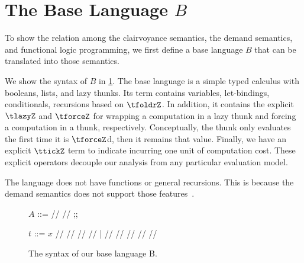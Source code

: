 \section{The Base Language $B$}



To show the relation among the clairvoyance semantics, the demand semantics, and
functional logic programming, we first define a base language $B$ that can be
translated into those semantics.

We show the syntax of $B$ in \cref{fig:syntax-base}. The base language is a
simple typed calculus with booleans, lists, and lazy thunks. Its term contains
variables, let-bindings, conditionals, recursions based on $\tfoldrZ$. In
addition, it contains the explicit \( \tlazyZ \) and \( \tforceZ \) for wrapping
a computation in a lazy thunk and forcing a computation in a thunk,
respectively. Conceptually, the thunk only evaluates the first time it is
\( \tforceZ \)d, then it remains that value. Finally, we have an explicit
\( \ttickZ \) term to indicate incurring one unit of computation cost. These
explicit operators decouple our analysis from any particular evaluation model.

The language does not have functions or general recursions. This is because the
demand semantics does not support those
features~\cite{bjerner1989,demand-semantics}.

\begin{figure}[t]
\begin{center}
\begin{bnf}
  \( A \) ::= \TBool{} //  //  ;;

  $t$ ::= $x$ //  // \ttrue{} // \tfalse{} //  |
  \tnil{} //  //  //  //  //
\end{bnf}
\end{center}
\caption{The syntax of our base language B.}\label{fig:syntax-base}
\end{figure}


